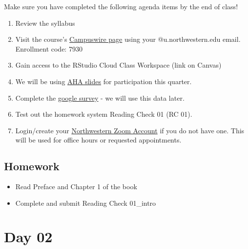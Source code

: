 \documentclass[
  letterpaper,
  DIV=11,
  numbers=noendperiod]{scrreprt}
\providecommand{\tightlist}{%
  \setlength{\itemsep}{0pt}\setlength{\parskip}{0pt}}\usepackage{longtable,booktabs,array}
\begin{document}
\begin{tcolorbox}[enhanced jigsaw, colframe=quarto-callout-note-color-frame, breakable, colback=white, toprule=.15mm, leftrule=.75mm, left=2mm, opacityback=0, rightrule=.15mm, arc=.35mm, bottomrule=.15mm]

Make sure you have completed the following agenda items by the end of
class!

\begin{enumerate}
\def\labelenumi{\arabic{enumi}.}
\tightlist
\item
  Review the syllabus
\item
  Visit the course's
  \href{https://campuswire.com/p/G88B46A25}{Campuswire page} using your
  @u.northwestern.edu email. Enrollment code: 7930
\item
  Gain access to the RStudio Cloud Class Workspace (link on Canvas)
\item
  We will be using \href{https://ahaslides.com/202PART1}{AHA slides} for
  participation this quarter.
\item
  Complete the
  \href{https://docs.google.com/forms/d/e/1FAIpQLSfdKddsg7CoaY7WwM2gc9iiUKr8mtSRbKQ8oLAgD9cv0ugJRw/viewform?usp=sf_link}{google
  survey} - we will use this data later.
\item
  Test out the homework system Reading Check 01 (RC 01).
\item
  Login/create your \href{https://northwestern.zoom.us/}{Northwestern
  Zoom Account} if you do not have one. This will be used for office
  hours or requested appointments.
\end{enumerate}

\end{tcolorbox}

\hypertarget{homework}{%
\section*{Homework}\label{homework}}

\begin{itemize}
\item
  Read Preface and Chapter 1 of the book
\item
  Complete and submit Reading Check 01\_intro
\end{itemize}


\hypertarget{day-02}{%
\chapter*{Day 02}\label{day-02}}
\end{document}

